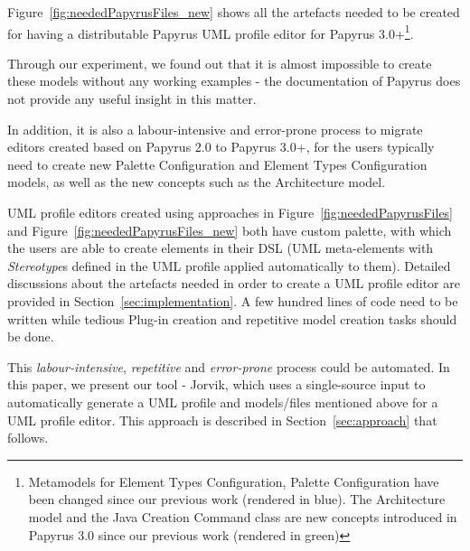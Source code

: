 Figure~\ref{fig:neededPapyrusFiles_new} shows all the artefacts needed to be created for having a distributable Papyrus UML profile editor for Papyrus 3.0+\footnote{Metamodels for Element Types Configuration, Palette Configuration have been changed since our previous work (rendered in blue). 
The Architecture model and the Java Creation Command class are new concepts introduced in Papyrus 3.0 since our previous work (rendered in green)}.

Through our experiment, we found out that it is almost impossible to create these models without any working examples - the documentation of Papyrus does not provide any useful insight in this matter.

In addition, it is also a labour-intensive and error-prone process to migrate editors created based on Papyrus 2.0 to Papyrus 3.0+, for the users typically need to create new Palette Configuration and Element Types Configuration models, as well as the new concepts such as the Architecture model.



UML profile editors created using approaches in Figure~\ref{fig:neededPapyrusFiles} and Figure~\ref{fig:neededPapyrusFiles_new} both have custom palette, with which the users are able to create elements in their DSL (UML meta-elements with \textit{Stereotype}s defined in the UML profile applied automatically to them).
Detailed discussions about the artefacts needed in order to create a UML profile editor are provided in Section~\ref{sec:implementation}.
A few hundred lines of code need to be written while tedious Plug-in creation and repetitive model creation tasks should be done.  

This \textit{labour-intensive}, \textit{repetitive} and \textit{error-prone} process could be automated. 
In this paper, we present our tool - Jorvik, which uses a single-source input to automatically generate a UML profile and models/files mentioned above for a UML profile editor. 
This approach is described in Section~\ref{sec:approach} that follows. 
